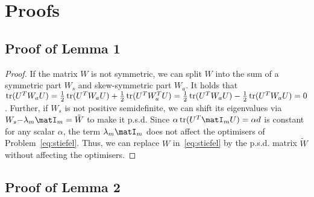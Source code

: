 \documentclass{article}
\begin{document}
{
\small


}

\clearpage
\appendix

\newcommand{\snum}{A}

\renewcommand{\theequation}{\snum\arabic{equation}}

\section{Proofs}
\subsection*{Proof of Lemma 1}
\begin{proof}
If the matrix $W$ is not symmetric, we can split $W$ into the sum of a symmetric part $W_s$ and skew-symmetric part $W_a$. It holds that $\operatorname{tr}(U^T W_a U) = \frac{1}{2}\operatorname{tr}(U^T W_a U)  + \frac{1}{2}\operatorname{tr}(U^T W_a^T U) =  \frac{1}{2}\operatorname{tr}(U^T W_a U)   -\frac{1}{2}\operatorname{tr}(U^T W_a U) = 0$. Further, if $W_s$ is not positive semidefinite, we can shift its eigenvalues via  $W_s {-} \lambda_{m}\matI_m = \tilde{W}$ to make it p.s.d. Since $\alpha \tr(U^T \matI_m U) = \alpha d$ is constant for any scalar $\alpha$, the term $\lambda_{m}\matI_m$ does not affect the optimisers of Problem~\eqref{eq:stiefel}. Thus,  we can replace $W$ in~\eqref{eq:stiefel} by the p.s.d. matrix $\tilde W$ without affecting the optimisers. 
\end{proof}


\subsection*{Proof of Lemma 2}
\end{document}
